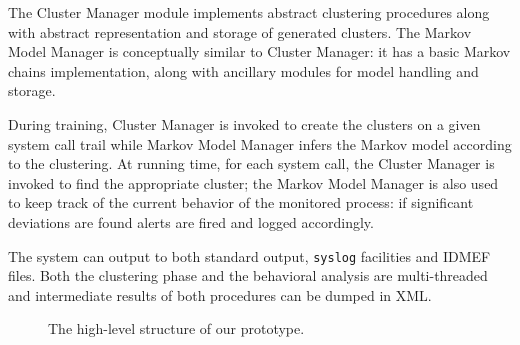 The Cluster Manager module implements abstract clustering procedures along with abstract representation and storage of generated clusters. The Markov Model Manager is conceptually similar to Cluster Manager: it has a basic Markov chains implementation, along with ancillary modules for model handling and storage.

During training, Cluster Manager is invoked to create the clusters on a given system call trail while Markov Model Manager infers the Markov model according to the clustering. At running time, for each system call, the Cluster Manager is invoked to find the appropriate cluster; the Markov Model Manager is also used to keep track of the current behavior of the monitored process: if significant deviations are found alerts are fired and logged accordingly.

The system can output to both standard output, \texttt{syslog} facilities and \ac{IDMEF} files. Both the clustering phase and the behavioral analysis are multi-threaded and intermediate results of both procedures can be dumped in \ac{XML}.

\begin{figure}[t]
  \hspace*{-.9cm}
  \caption{The high-level structure of our prototype.}
  \label{fig:architetura_hids}
\end{figure}

